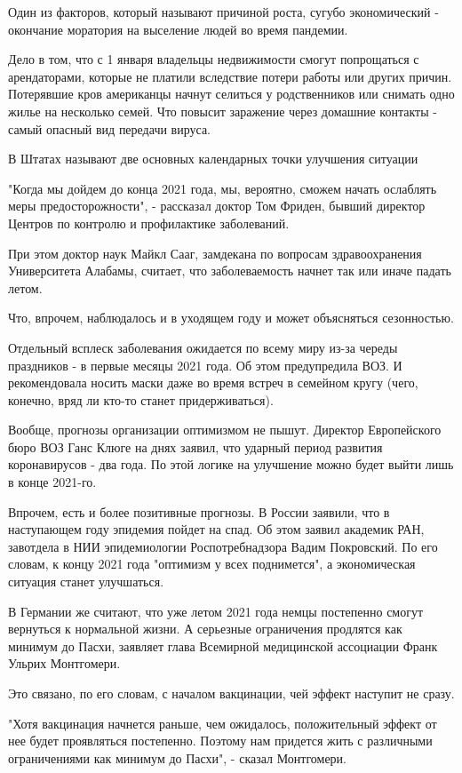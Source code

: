 Один из факторов, который называют причиной роста, сугубо экономический -
окончание моратория на выселение людей во время пандемии.

Дело в том, что с 1 января владельцы недвижимости смогут попрощаться с
арендаторами, которые не платили вследствие потери работы или других причин.
Потерявшие кров американцы начнут селиться у родственников или снимать одно
жилье на несколько семей. Что повысит заражение через домашние контакты - самый
опасный вид передачи вируса. 

В Штатах называют две основных календарных точки улучшения ситуации

"Когда мы дойдем до конца 2021 года, мы, вероятно, сможем начать ослаблять меры
предосторожности", - рассказал доктор Том Фриден, бывший директор Центров по
контролю и профилактике заболеваний.

При этом доктор наук Майкл Сааг, замдекана по вопросам здравоохранения
Университета Алабамы, считает, что заболеваемость начнет так или иначе падать
летом.

Что, впрочем, наблюдалось и в уходящем году и может объясняться сезонностью. 

Отдельный всплеск заболевания ожидается по всему миру из-за череды праздников -
в первые месяцы 2021 года. Об этом предупредила ВОЗ. И рекомендовала носить
маски даже во время встреч в семейном кругу (чего, конечно, вряд ли кто-то
станет придерживаться). 

Вообще, прогнозы организации оптимизмом не пышут. Директор Европейского бюро
ВОЗ Ганс Клюге на днях заявил, что ударный период развития коронавирусов - два
года. По этой логике на улучшение можно будет выйти лишь в конце 2021-го. 

Впрочем, есть и более позитивные прогнозы. В России заявили, что в наступающем
году эпидемия пойдет на спад. Об этом заявил академик РАН, завотдела в НИИ
эпидемиологии Роспотребнадзора Вадим Покровский. По его словам, к концу 2021
года "оптимизм у всех поднимется", а экономическая ситуация станет улучшаться.

В Германии же считают, что уже летом 2021 года немцы постепенно смогут
вернуться к нормальной жизни. А серьезные ограничения продлятся как минимум до
Пасхи, заявляет глава Всемирной медицинской ассоциации Франк Ульрих Монтгомери.

Это связано, по его словам, с началом вакцинации, чей эффект наступит не сразу. 

"Хотя вакцинация начнется раньше, чем ожидалось, положительный эффект от нее
будет проявляться постепенно. Поэтому нам придется жить с различными
ограничениями как минимум до Пасхи", - сказал Монтгомери.

